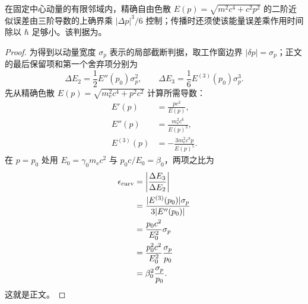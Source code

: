 \begin{proposition}
在固定中心动量的有限邻域内，精确自由色散 $E(p)=\sqrt{m^2c^4+c^2p^2}$ 的二阶近似误差由三阶导数的上确界乘 $|\Delta p|^3/6$ 控制；传播时还须使该能量误差乘作用时间除以 $\hbar$ 足够小。该判据为。
\end{proposition}
\begin{proof}
为得到以动量宽度 $\sigma_p$ 表示的局部截断判据，取工作窗边界 $|\delta p|=\sigma_p$；正文 的最后保留项和第一个舍弃项分别为
\[
\Delta E_2=\frac12E''(p_0)\sigma_p^2,
\qquad
\Delta E_3=\frac16E^{(3)}(p_0)\sigma_p^3.
\]
先从精确色散 $E(p)=\sqrt{m_{\mathrm e}^2c^4+p^2c^2}$ 计算所需导数：
\begin{align*}
E'(p)&=\frac{pc^2}{E(p)},\\
E''(p)&=\frac{m_{\mathrm e}^2c^6}{E(p)^3},\\
E^{(3)}(p)
&=-\frac{3m_{\mathrm e}^2c^8p}{E(p)^5}.
\end{align*}
在 $p=p_0$ 处用 $E_0=\gamma_0m_{\mathrm e} c^2$ 与 $p_0c/E_0=\beta_0$，两项之比为
\begin{align*}
\epsilon_{\rm curv}
&=\left|\frac{\Delta E_3}{\Delta E_2}\right|\\
&=\frac{|E^{(3)}(p_0)|\sigma_p}{3|E''(p_0)|}\\
&=\frac{p_0c^2}{E_0^2}\sigma_p\\
&=\frac{p_0^2c^2}{E_0^2}\frac{\sigma_p}{p_0}\\
&=\beta_0^2\frac{\sigma_p}{p_0}.
\end{align*}
这就是正文。
\end{proof}

